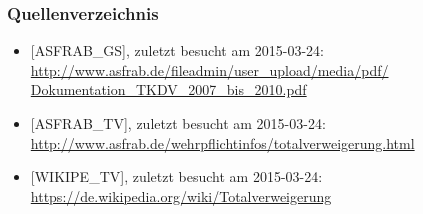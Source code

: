 \documentclass{beamer}
\begin{document}
	\begin{frame}
		\frametitle{Quellenverzeichnis}
		\begin{itemize}
			\item {[ASFRAB\_GS], zuletzt besucht am 2015-03-24:
			\href{http://www.asfrab.de/fileadmin/user_upload/media/pdf/Dokumentation_TKDV_2007_bis_2010.pdf}{http://www.asfrab.de/fileadmin/user\_upload/media/pdf/\\Dokumentation\_TKDV\_2007\_bis\_2010.pdf}}
	
			\item {[ASFRAB\_TV], zuletzt besucht am 2015-03-24: \href{http://www.asfrab.de/wehrpflichtinfos/totalverweigerung.html}{http://www.asfrab.de/wehrpflichtinfos/totalverweigerung.html}} 
			\item {[WIKIPE\_TV], zuletzt besucht am 2015-03-24: \href{https://de.wikipedia.org/wiki/Totalverweigerung}{https://de.wikipedia.org/wiki/Totalverweigerung}}
		\end{itemize}
	\end{frame}
	  
\end{document}
